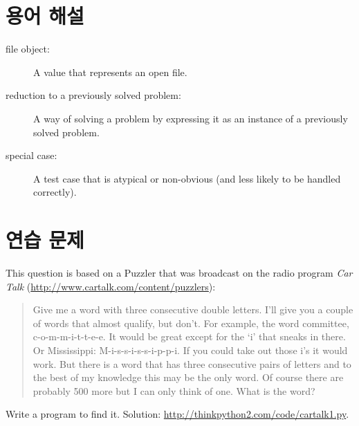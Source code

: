\documentclass[10pt]{book}
\begin{document}
\section{용어 해설}

\begin{description}

\item[file object:] A value that represents an open file.

\item[reduction to a previously solved problem:] A way of solving a
  problem by expressing it as an instance of a previously solved
  problem.  

\item[special case:] A test case that is atypical or non-obvious
(and less likely to be handled correctly).

\end{description}


\section{연습 문제}

\begin{exercise}

This question is based on a Puzzler that was broadcast on the radio
program {\em Car Talk} 
(\url{http://www.cartalk.com/content/puzzlers}):

\begin{quote}
Give me a word with three consecutive double letters. I'll give you a
couple of words that almost qualify, but don't. For example, the word
committee, c-o-m-m-i-t-t-e-e. It would be great except for the `i' that
sneaks in there. Or Mississippi: M-i-s-s-i-s-s-i-p-p-i. If you could
take out those i's it would work. But there is a word that has three
consecutive pairs of letters and to the best of my knowledge this may
be the only word. Of course there are probably 500 more but I can only
think of one. What is the word?
\end{quote}

Write a program to find it.
Solution: \url{http://thinkpython2.com/code/cartalk1.py}.

\end{exercise}
\end{document}
